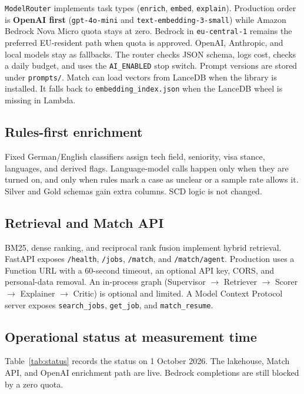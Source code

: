 \texttt{ModelRouter} implements task types (\texttt{enrich}, \texttt{embed}, \texttt{explain}). Production order is \textbf{OpenAI first} (\texttt{gpt-4o-mini} and \texttt{text-embedding-3-small}) while Amazon Bedrock Nova Micro quota stays at zero. Bedrock in \texttt{eu-central-1} remains the preferred EU-resident path when quota is approved. OpenAI, Anthropic, and local models stay as fallbacks. The router checks JSON schema, logs cost, checks a daily budget, and uses the \texttt{AI\_ENABLED} stop switch. Prompt versions are stored under \texttt{prompts/}. Match can load vectors from LanceDB when the library is installed. It falls back to \texttt{embedding\_index.json} when the LanceDB wheel is missing in Lambda.

\subsection{Rules-first enrichment}

Fixed German/English classifiers assign tech field, seniority, visa stance, languages, and derived flags. Language-model calls happen only when they are turned on, and only when rules mark a case as unclear or a sample rate allows it. Silver and Gold schemas gain extra columns. SCD logic is not changed.

\subsection{Retrieval and Match API}

BM25, dense ranking, and reciprocal rank fusion implement hybrid retrieval. FastAPI exposes \texttt{/health}, \texttt{/jobs}, \texttt{/match}, and \texttt{/match/agent}. Production uses a Function URL with a 60-second timeout, an optional API key, CORS, and personal-data removal. An in-process graph (Supervisor $\rightarrow$ Retriever $\rightarrow$ Scorer $\rightarrow$ Explainer $\rightarrow$ Critic) is optional and limited. A Model Context Protocol server exposes \texttt{search\_jobs}, \texttt{get\_job}, and \texttt{match\_resume}.

\subsection{Operational status at measurement time}

Table~\ref{tab:status} records the status on 1 October 2026. The lakehouse, Match API, and OpenAI enrichment path are live. Bedrock completions are still blocked by a zero quota.

